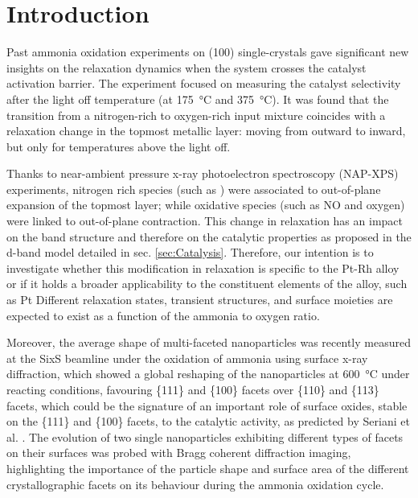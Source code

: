 \section{Introduction}

Past ammonia oxidation experiments on  (100) \parencite{Resta2020a} single-crystals gave significant new insights on the relaxation dynamics when the system crosses the catalyst activation barrier.
The experiment focused on measuring the catalyst selectivity after the light off temperature (at \qty{175}{\degreeCelsius} and \qty{375}{\degreeCelsius}).
It was found that the transition from a nitrogen-rich to oxygen-rich input mixture coincides with a relaxation change in the topmost metallic layer: moving from outward to inward, but only for temperatures above the light off.

Thanks to near-ambient pressure x-ray photoelectron spectroscopy (NAP-XPS) experiments, nitrogen rich species (such as ) were associated to out-of-plane expansion of the topmost layer; while oxidative species (such as NO and oxygen) were linked to out-of-plane contraction.
This change in relaxation has an impact on the band structure and therefore on the catalytic properties as proposed in the d-band model detailed in sec. \ref{sec:Catalysis}.
Therefore, our intention is to investigate whether this modification in relaxation is specific to the Pt-Rh alloy or if it holds a broader applicability to the constituent elements of the alloy, such as Pt
Different relaxation states, transient structures, and surface moieties are expected to exist as a function of the ammonia to oxygen ratio.

Moreover, the average shape of multi-faceted nanoparticles was recently measured at the SixS beamline under the oxidation of ammonia using surface x-ray diffraction, which showed a global reshaping of the nanoparticles at \qty{600}{\degreeCelsius} under reacting conditions, favouring \{111\} and \{100\} facets over \{110\} and \{113\} facets, which could be the signature of an important role of surface oxides, stable on the \{111\} and \{100\} facets, to the catalytic activity, as predicted by Seriani et al. \parencite*{Seriani2008}.
The evolution of two single nanoparticles exhibiting different types of facets on their surfaces was probed with Bragg coherent diffraction imaging, highlighting the importance of the particle shape and surface area of the different crystallographic facets on its behaviour during the ammonia oxidation cycle.

